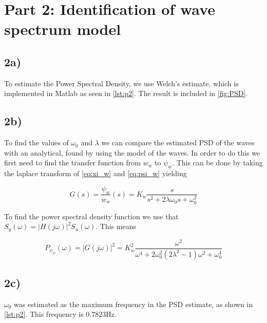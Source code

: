 
\section{Part 2: Identification of wave spectrum model}

\subsection{2a)}


To estimate the Power Spectral Density, we use Welch's estimate, which is implemented in Matlab as seen in \cref{lst:p2}. The result is included in \cref{fig:PSD}.



\subsection{2b)}
To find the values of $\omega_0$ and $\lambda$ we can compare the estimated PSD of the waves with an analytical, found by using the model of the waves. In order to do this we first need to find the transfer function from $w_w$ to $\psi_w$. This can be done by taking the laplace transform of \cref{eq:xi_w} and \cref{eq:psi_w} yielding

\begin{equation}
    G(s) = \frac{\psi_w}{w_w}(s) = K_w\frac{s}{s^2+2\lambda\omega_0s+\omega_0^2} \label{eq:G(s)}
\end{equation}

To find the power spectral density function we use that $S_y(\omega) = |H(j\omega)|^2S_u(\omega)$. This means

\begin{equation}
    P_{\psi_w}(\omega) = |G(j\omega)|^2 = K_w^2\frac{\omega^2}{\omega^4+2\omega_0^2(2\lambda^2-1)\omega^2+\omega_0^4} \label{eq:PSD}
\end{equation}


\subsection{2c)}

$\omega_0$ was estimated as the maximum frequency in the PSD estimate, as shown in \cref{lst:p2}. This frequency is $0.7823\si{\Hz}$.

